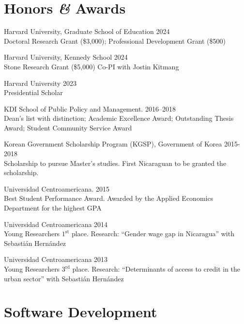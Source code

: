 \documentclass[a4paper,10pt]{article}
\renewenvironment{itemize}{
  \begin{list}{}
    { \setlength{\itemsep}{5pt}
      \setlength{\parsep}{0pt}
      \setlength{\topsep}{0pt}
      \setlength{\leftmargin}{0em} } }{
  \end{list}}
\begin{document}
\section*{Honors \textit{\&} Awards}
\begin{itemize}
\item Harvard University, Graduate School of Education \hfill 2024 \\ {\small Doctoral Research Grant (\$3,000); Professional Development Grant (\$500)}
\item Harvard University, Kennedy School \hfill 2024 \\ {\small Stone Research Grant (\$5,000) Co-PI with Jostin Kitmang}
\item Harvard University \hfill 2023 \\ {\small Presidential Scholar}
\item KDI School of Public Policy and Management. \hfill 2016--2018 \\ {\small Dean's list with distinction; Academic Excellence Award; Outstanding Thesis Award; Student Community Service Award}
\item Korean Government Scholarship Program (KGSP), Government of Korea \hfill 2015-2018 \\ {\small Scholarship to pursue Master's studies. First Nicaraguan to be granted the scholarship.}
\item Universidad Centroamericana. \hfill 2015 \\ {\small  Best Student Performance Award. Awarded by the Applied Economics Department for the highest GPA}
\item Universidad Centroamericana \hfill 2014 \\ {\small Young Researchers $1^{\textrm{st}}$ place. Research: ``Gender wage gap in Nicaragua'' with Sebastián Hernández}
\item Universidad Centroamericana \hfill 2013 \\ {\small Young Researchers $3^{\textrm{rd}}$ place. Research: ``Determinants of access to credit in the urban sector'' with Sebastián Hernández}
\end{itemize}


\section*{Software Development}
\end{document}
